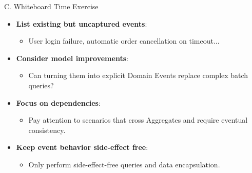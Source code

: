 \documentclass{beamer}
\begin{document}
\begin{frame}{C. Whiteboard Time Exercise}
  \begin{itemize}
    \item \textbf{List existing but uncaptured events}:
      \begin{itemize}
        \item User login failure, automatic order cancellation on timeout...
      \end{itemize}
    \item \textbf{Consider model improvements}:
      \begin{itemize}
        \item Can turning them into explicit Domain Events replace complex batch queries?
      \end{itemize}
    \item \textbf{Focus on dependencies}:
      \begin{itemize}
        \item Pay attention to scenarios that cross Aggregates and require eventual consistency.
      \end{itemize}
    \item \textbf{Keep event behavior side-effect free}:
      \begin{itemize}
        \item Only perform side-effect-free queries and data encapsulation.
      \end{itemize}
  \end{itemize}
\end{frame}
\end{document}
